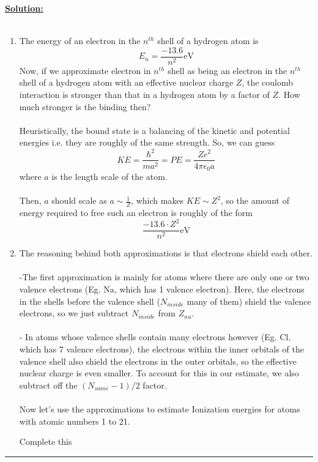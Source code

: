 \documentclass[11pt]{article}
\begin{document}
\vskip 0.5cm
\textbf{\underline{Solution:}}
\\
\\
\begin{enumerate}[label=(\alph*)]
  \item The energy of an electron in the $n^{th}$ shell of a hydrogen atom is $$ E_n = \frac{-13.6}{n^2} \text{eV} $$ Now, if we approximate electron in $n^{th}$ shell as being an electron in the $n^{th}$ shell of a hydrogen atom with an effective nuclear charge $Z$, the coulomb interaction is stronger than that in a hydrogen atom by a factor of $Z$. How much stronger is the binding then?
  \\
  \\
  Heuristically, the bound state is a balancing of the kinetic and potential energies i.e. they are roughly of the same strength. So, we can guess
  $$ KE = \frac{\hbar^2}{ma^2} = PE = \frac{Ze^2}{4\pi\epsilon_0 a} $$ where $a$ is the length scale of the atom.
  \\
  \\
  Then, $a$ should scale as $a \sim \frac{1}{Z}$, which makes $KE \sim Z^2$, so the amount of energy required to free such an electron is roughly of the form $$\frac{-13.6 \cdot Z^2}{n^2} \text{eV}$$

  \item The reasoning behind both approximations is that electrons shield each other. \\
  \\
  -The first approximation is mainly for atoms where there are only one or two valence electrons (Eg. Na, which has 1 valence electron). Here, the electrons in the shells before the valence shell ($N_{inside}$ many of them) shield the valence electrons, so we just subtract $N_{inside}$ from $Z_{nu}$. \\
  \\
  - In atoms whose valence shells contain many electrons however (Eg. Cl, which has 7 valence electrons), the electrons within the inner orbitals of the valence shell also shield the electrons in the outer orbitals, so the effective nuclear charge is even smaller. To account for this in our estimate, we also subtract off the $(N_{same} - 1)/2$ factor.
  \\
  \\
  Now let's use the approximations to estimate Ionization energies for atoms with atomic numbers 1 to 21. \begin{note}{Complete this}\end{note}
\end{enumerate}
\vskip 0.5cm
\hrule
\pagebreak
\end{document}
